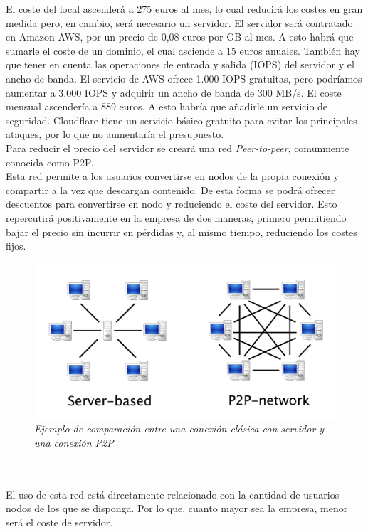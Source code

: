 \documentclass[openany,overnay,a4paper, twoside, 12pt]{book}
\begin{document}
El coste del local ascenderá a 275 euros al mes, lo cual reducirá los costes en gran medida pero, en cambio, será necesario un servidor.
El servidor será contratado en Amazon AWS, por un precio de 0,08 euros por GB al mes. A esto habrá que sumarle el coste de un dominio, el cual asciende a 15 euros anuales. También hay que tener en cuenta las operaciones de entrada y salida (IOPS) del servidor y el ancho
de banda. El servicio de AWS ofrece 1.000 IOPS gratuitas, pero podríamos aumentar a 3.000 IOPS y adquirir un ancho de banda de 300 MB/s. El coste mensual ascendería a 889 euros.
\newpage
A esto habría que añadirle un servicio de seguridad. Cloudflare tiene un servicio básico gratuito para evitar los principales ataques, por lo que no aumentaría el presupuesto.
\\
Para reducir el precio del servidor se creará una red \textit{Peer-to-peer}, comunmente conocida como P2P.\\Esta red permite a los usuarios convertirse en nodos de la propia conexión y compartir a la vez que descargan contenido. De esta forma se podrá ofrecer descuentos para convertirse en nodo y reduciendo el coste del servidor. Esto repercutirá positivamente en la empresa de dos maneras, primero permitiendo bajar el precio sin incurrir en pérdidas y, al mismo tiempo, reduciendo los costes fijos. 
\begin{figure}[h]
\centering
\renewcommand{\figurename}{Imagen}

\includegraphics[scale = 0.1]{imagenes/p2p.jpg}
\renewcommand{\thefigure}{}
\caption{\textit{Ejemplo de comparación entre una conexión clásica con servidor y una conexión P2P}}
\end{figure}
\\\\
El uso de esta red está directamente relacionado con la cantidad de usuarios-nodos de los que se disponga. Por lo que, cuanto mayor sea la empresa, menor será el coste de servidor.
\end{document}
